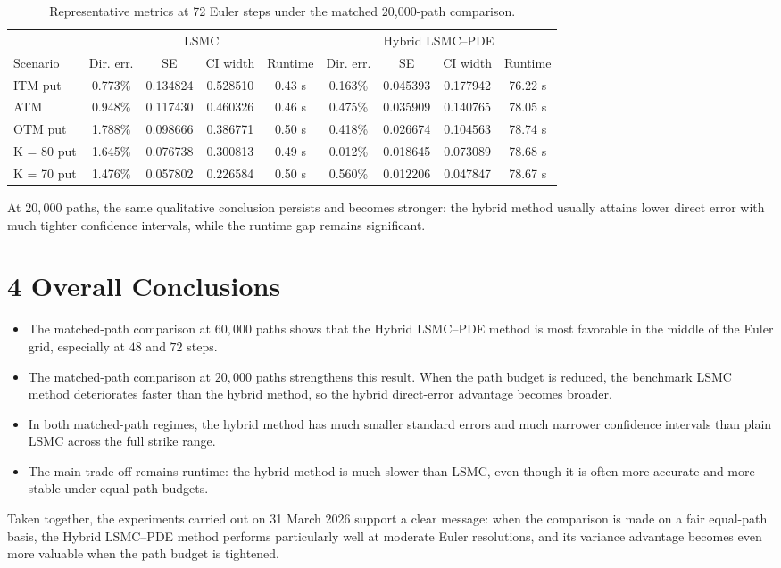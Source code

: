 \documentclass[11pt,a4paper]{article}
\begin{document}
\begin{table}[p]
\centering
\caption{Representative metrics at 72 Euler steps under the matched 20,000-path comparison.}
\begin{tabular}{lcccccccc}
\toprule
& \multicolumn{4}{c}{LSMC} & \multicolumn{4}{c}{Hybrid LSMC--PDE} \\
\cmidrule(lr){2-5}\cmidrule(lr){6-9}
Scenario & Dir. err. & SE & CI width & Runtime & Dir. err. & SE & CI width & Runtime \\
\midrule
ITM put & 0.773\% & 0.134824 & 0.528510 & 0.43 s & 0.163\% & 0.045393 & 0.177942 & 76.22 s \\
ATM & 0.948\% & 0.117430 & 0.460326 & 0.46 s & 0.475\% & 0.035909 & 0.140765 & 78.05 s \\
OTM put & 1.788\% & 0.098666 & 0.386771 & 0.50 s & 0.418\% & 0.026674 & 0.104563 & 78.74 s \\
K = 80 put & 1.645\% & 0.076738 & 0.300813 & 0.49 s & 0.012\% & 0.018645 & 0.073089 & 78.68 s \\
K = 70 put & 1.476\% & 0.057802 & 0.226584 & 0.50 s & 0.560\% & 0.012206 & 0.047847 & 78.67 s \\
\bottomrule
\end{tabular}
\end{table}

At \(20{,}000\) paths, the same qualitative conclusion persists and becomes stronger: the hybrid method usually attains lower direct error with much tighter confidence intervals, while the runtime gap remains significant.

\section*{4 \quad Overall Conclusions}

\begin{itemize}
\item The matched-path comparison at \(60{,}000\) paths shows that the Hybrid LSMC--PDE method is most favorable in the middle of the Euler grid, especially at \(48\) and \(72\) steps.
\item The matched-path comparison at \(20{,}000\) paths strengthens this result. When the path budget is reduced, the benchmark LSMC method deteriorates faster than the hybrid method, so the hybrid direct-error advantage becomes broader.
\item In both matched-path regimes, the hybrid method has much smaller standard errors and much narrower confidence intervals than plain LSMC across the full strike range.
\item The main trade-off remains runtime: the hybrid method is much slower than LSMC, even though it is often more accurate and more stable under equal path budgets.
\end{itemize}

Taken together, the experiments carried out on 31 March 2026 support a clear message: when the comparison is made on a fair equal-path basis, the Hybrid LSMC--PDE method performs particularly well at moderate Euler resolutions, and its variance advantage becomes even more valuable when the path budget is tightened.
\end{document}
